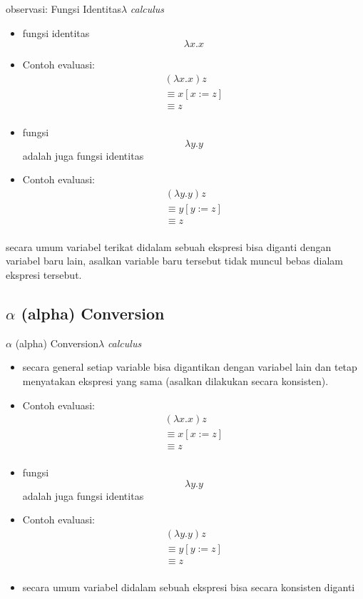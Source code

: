 \documentclass[aspectratio=1610,10pt,handout]{beamer}
\newcommand{\lc}{$\lambda$ {\it calculus}\ }
\begin{document}
\begin{frame}{observasi: Fungsi Identitas}{\lc}

	\begin{itemize}
		\item fungsi identitas $$\lambda x. x$$
		\item Contoh evaluasi:
		\[
		\begin{array}{l}
		(\lambda x. x) z \\
		\equiv x[x:= z] \\
		\equiv z\\
		\end{array}
		\]
		\pause
		\item fungsi $$\lambda y. y$$ adalah juga fungsi identitas
		\item Contoh evaluasi:
		\[
		\begin{array}{l}
		(\lambda y. y) z \\
		\equiv y[y:= z] \\
		\equiv z\\
		\end{array}
		\]

	\end{itemize}
	\pause
	\alert{
		secara umum variabel terikat didalam sebuah ekspresi bisa diganti dengan variabel baru lain, asalkan variable baru tersebut tidak muncul bebas dialam ekspresi tersebut.
	}
\end{frame}

\subsection{$\alpha$ (alpha) Conversion}
\begin{frame}{$\alpha$ (alpha) Conversion}{\lc}
	\begin{itemize}
		\item secara general setiap variable bisa digantikan dengan variabel lain dan tetap menyatakan ekspresi yang sama (asalkan dilakukan secara konsisten).
		\item Contoh evaluasi:
		\[
		\begin{array}{l}
		(\lambda x. x) z \\
		\equiv x[x:= z] \\
		\equiv z\\
		\end{array}
		\]

		\item fungsi $$\lambda y. y$$ adalah juga fungsi identitas
		\item Contoh evaluasi:
		\[
		\begin{array}{l}
		(\lambda y. y) z \\
		\equiv y[y:= z] \\
		\equiv z\\
		\end{array}
		\]
		\item secara umum variabel didalam sebuah ekspresi bisa secara konsisten diganti
	\end{itemize}
\end{frame}
\end{document}

